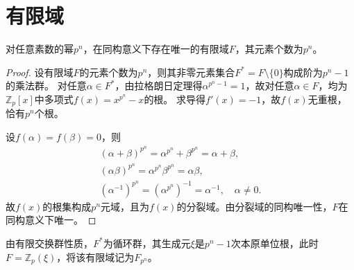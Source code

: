 \documentclass[../../main.tex]{subfiles}%
\begin{document}
\section{有限域}

\begin{theorem}
对任意素数的幂$p^n$，在同构意义下存在唯一的有限域$F$，其元素个数为$p^n$。
\end{theorem}
\begin{proof}

设有限域$F$的元素个数为$p^n$，则其非零元素集合$F^*=F\setminus\{0\}$构成阶为$p^n-1$的乘法群。
对任意$\alpha\in F^*$，由拉格朗日定理得$\alpha^{p^n-1}=1$，故对任意$\alpha\in F$，均为$\mathbb{Z}_p[x]$中多项式$f(x)=x^{p^n}-x$的根。
求导得$f'(x)=-1$，故$f(x)$无重根，恰有$p^n$个根。

设$f(\alpha)=f(\beta)=0$，则
\begin{align*}
(\alpha+\beta)^{p^n}=\alpha^{p^n}+\beta^{p^n}=\alpha+\beta,\\
(\alpha\beta)^{p^n}=\alpha^{p^n}\beta^{p^n}=\alpha\beta,\\
(\alpha^{-1})^{p^n}=(\alpha^{p^n})^{-1}=\alpha^{-1},\quad \alpha\neq0.
\end{align*}
故$f(x)$的根集构成$p^n$元域，且为$f(x)$的分裂域。由分裂域的同构唯一性，$F$在同构意义下唯一。

\end{proof}

\begin{remark}
由有限交换群性质，$F^*$为循环群，其生成元$\xi$是$p^n-1$次本原单位根，此时$F=\mathbb{Z}_p(\xi)$，将该有限域记为$F_{p^n}$。
\end{remark}
\end{document}
